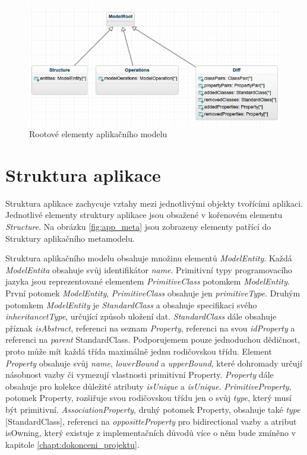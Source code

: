 \documentclass[11pt,twoside,a4paper]{book}
\begin{document}
\begin{figure}[h]
\begin{center}
\includegraphics[width=15cm]{figures/app_roots}
\caption{Rootové elementy aplikačního modelu}
\label{fig:app_roots}
\end{center}
\end{figure}
\FloatBarrier

\section{Struktura aplikace}

Struktura aplikace zachycuje vztahy mezi jednotlivými objekty
tvořícími aplikaci. Jednotlivé elementy struktury aplikace jsou obsažené v
kořenovém elementu \textit{Structure}. Na obrázku \ref{fig:app_meta} jsou
zobrazeny elementy patřící do Struktury aplikačního metamodelu.

Struktura aplikačního modelu obsahuje množinu elementů \textit{ModelEntity}.
Každá \textit{ModelEntita} obsahuje svůj identifikátor \textit{name}. Primitivní
typy programovacího jazyka jsou reprezentované elementem \textit{PrimitiveClass}
potomkem \textit{ModelEntity}. První potomek \textit{ModelEntity},
\textit{PrimitiveClass} obsahuje jen \textit{primitiveType}.
Druhým potomkem \textit{ModelEntity} je \textit{StandardClass} a obsahuje
specifikaci svého \textit{inheritancetType}, určující způsob uložení dat.
\textit{StandardClass} dále obsahuje příznak \textit{isAbstract}, referenci na
seznam \textit{Property}, referenci na svou \textit{idProperty} a referenci na
\textit{parent} StandardClass.
Podporujemem pouze jednoduchou dědičnost, proto může mít každá třída maximálně 
jednu rodičovskou třídu. Element \textit{Property} obsahuje svůj \textit{name},
\textit{lowerBound} a \textit{upperBound}, které dohromady určují násobnost
vazby či vymezují vlastnosti primitivní Property. \textit{Property} dále
obsahuje pro kolekce důležité atributy \textit{isUnique} a \textit{isUnique}.
\textit{PrimitiveProperty}, potomek Property, rozšiřuje svou rodičovskou třídu
jen o svůj \textit{type}, který musí být primitivní.
\textit{AssociationProperty}, druhý potomek Property, obsahuje také
\textit{type} [StandardClass], referenci na \textit{oppositteProperty} pro
bidirectional vazby a atribut isOwning, který existuje z implementačních důvodů
více o něm bude zmíněno v kapitole \ref{chapt:dokonceni_projektu}. \\
\end{document}

